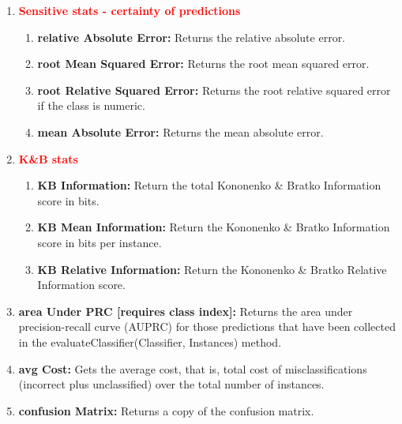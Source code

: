 \documentclass[a4paper,12pt, english]{article}
\begin{document}
\begin{enumerate}
\begin{enumerate}
\end{enumerate}



\item \textbf{\textcolor{red}{Sensitive stats - certainty of predictions}}
\begin{enumerate}

\item \textbf{relative Absolute Error: }
          Returns the relative absolute error. 

\item \textbf{root Mean Squared Error: }
          Returns the root mean squared error.           

\item \textbf{root Relative Squared Error: }
          Returns the root relative squared error if the class is numeric. 
                    
\item \textbf{mean Absolute Error: }
          Returns the mean absolute error. 
\end{enumerate}    

\item  \textbf{\textcolor{red}{K\&B stats}}
\begin{enumerate}          
\item \textbf{KB Information: }
          Return the total Kononenko \& Bratko Information score in bits. 
          
\item \textbf{KB Mean Information: }
          Return the Kononenko \& Bratko Information score in bits per instance. 
          
\item \textbf{KB Relative Information: }
          Return the Kononenko \& Bratko Relative Information score.
\end{enumerate}


\item \textbf{area Under PRC [requires class index]: }
          Returns the area under precision-recall curve (AUPRC) for those predictions that have been collected in the evaluateClassifier(Classifier, Instances) method.
          


\item \textbf{avg Cost: }
          Gets the average cost, that is, total cost of misclassifications (incorrect plus unclassified) over the total number of instances.

\item \textbf{confusion Matrix: }
          Returns a copy of the confusion matrix.
          


\end{enumerate}
\end{document}
